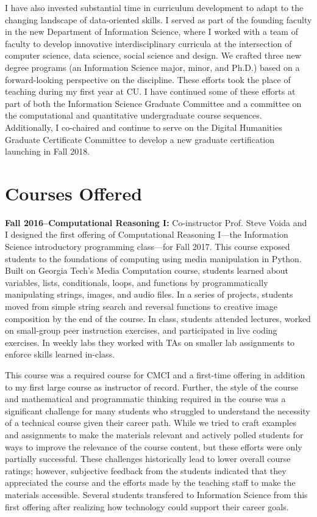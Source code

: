 \documentclass[11pt]{article}
\begin{document}
I have also invested substantial time in curriculum development to adapt to the changing landscape of data-oriented skills. I served as part of the founding faculty in the new Department of Information Science, where I worked with a team of faculty to develop innovative interdisciplinary curricula at the intersection of computer science, data science, social science and design. We crafted three new degree programs (an Information Science major, minor, and Ph.D.) based on a forward-looking perspective on the discipline. These efforts took the place of teaching during my first year at CU. I have continued some of these efforts at part of both the Information Science Graduate Committee and a committee on the computational and quantitative undergraduate course sequences. Additionally, I co-chaired and continue to serve on the Digital Humanities Graduate Certificate Committee to develop a new graduate certification launching in Fall 2018. 

\section*{Courses Offered}

\textbf{Fall 2016--Computational Reasoning I: }
Co-instructor Prof. Steve Voida and I designed the first offering of Computational Reasoning I---the Information Science introductory programming class---for Fall 2017. This course exposed students to the foundations of computing using media manipulation in Python. Built on Georgia Tech's Media Computation course, students learned about variables, lists, conditionals, loops, and functions by programmatically manipulating strings, images, and audio files. In a series of projects, students moved from simple string search and reversal functions to creative image composition by the end of the course. In class, students attended lectures, worked on small-group peer instruction exercises, and participated in live coding exercises. In weekly labs they worked with TAs on smaller lab assignments to enforce skills learned in-class.

This course was a required course for CMCI and a first-time offering in addition to my first large course as instructor of record. Further, the style of the course and mathematical and programmatic thinking required in the course was a significant challenge for many students who struggled to understand the necessity of a technical course given their career path. While we tried to craft examples and assignments to make the materials relevant and actively polled students for ways to improve the relevance of the course content, but these efforts were only partially successful.
These challenges historically lead to lower overall course ratings; however, subjective feedback from the students indicated that they appreciated the course and the efforts made by the teaching staff to make the materials accessible. Several students transfered to Information Science from this first offering after realizing how technology could support their career goals. 
\end{document}
